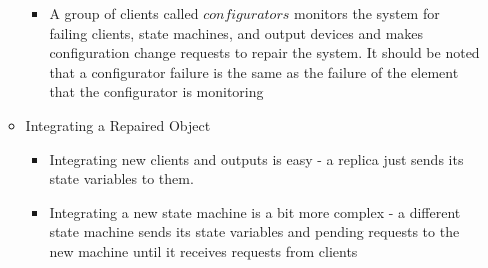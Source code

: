 \documentclass[a4paper]{article}
\begin{document}
\begin{itemize}
\begin{itemize}
\begin{itemize}
\item A group of clients called $configurators$ monitors the system for failing clients, state machines, and output devices and makes configuration change requests to repair the system. It should be noted that a configurator failure is the same as the failure of the element that the configurator is monitoring
\end{itemize}

\item Integrating a Repaired Object
\begin{itemize}
\item Integrating new clients and outputs is easy - a replica just sends its state variables to them.

\item Integrating a new state machine is a bit more complex - a different state machine sends its state variables and pending requests to the new machine until it receives requests from clients
\end{itemize}
\end{itemize}

\end{itemize}






\end{document}
